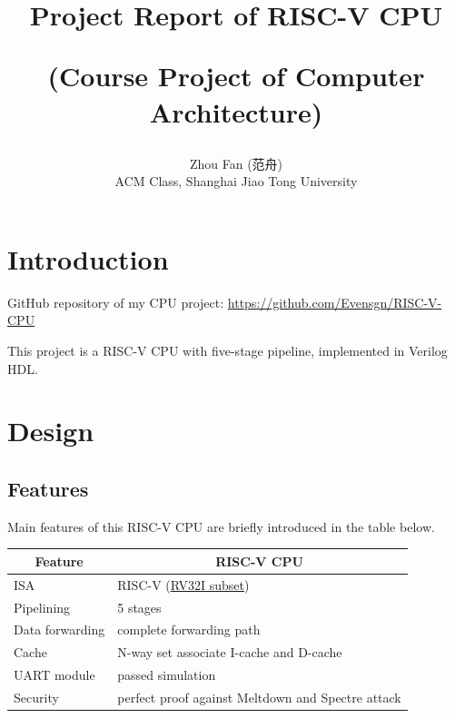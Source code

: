 \documentclass[12pt, a4paper]{article}
\title{Project Report of RISC-V CPU\\\begin{large}(Course Project of Computer Architecture)\end{large}}
\author{Zhou Fan (范舟)\\ACM Class, Shanghai Jiao Tong University}
\date{}
\theoremstyle{margin}
\begin{document}
\maketitle

\section{Introduction}

GitHub repository of my CPU project: \url{https://github.com/Evensgn/RISC-V-CPU}

This project is a RISC-V CPU with five-stage pipeline, implemented in Verilog HDL. 

\section{Design}

\subsection{Features}

Main features of this RISC-V CPU are briefly introduced in the table below.

\begin{table}[H]
\centering
\begin{tabular}{@{}ll@{}}
\toprule
\multicolumn{1}{c}{Feature} & \multicolumn{1}{c}{RISC-V CPU}                                                                        \\ \midrule
ISA                         & RISC-V (\href{https://github.com/Evensgn/RISC-V-CPU/blob/dev/doc/inst-supported.md}{RV32I subset}) \\
Pipelining                  & 5 stages                                                                                              \\
Data forwarding             & complete forwarding path                                                                              \\
Cache                       & N-way set associate I-cache and D-cache\footnotemark[1]                                 \\
UART module                 & passed simulation \footnotemark[2] \\
Security                    & perfect proof against Meltdown and Spectre attack \footnotemark[3] \\
 \bottomrule
\end{tabular}
\end{table}
\end{document}
